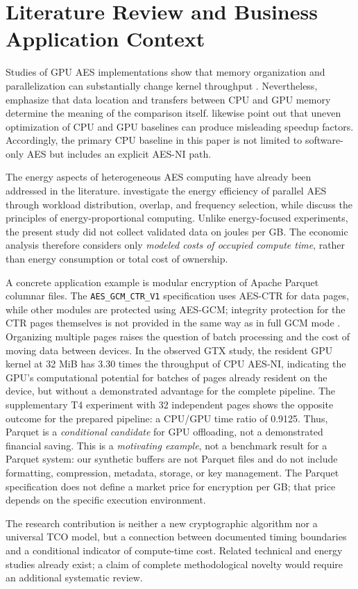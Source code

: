\documentclass[11pt,b5paper]{article}
\begin{document}
\section{Literature Review and Business Application Context}
Studies of GPU AES implementations show that memory organization and parallelization can substantially change kernel throughput \citep{iwai2012,tezcan2021}. Nevertheless, \citet{gregg2011} emphasize that data location and transfers between CPU and GPU memory determine the meaning of the comparison itself. \citet{lee2010} likewise point out that uneven optimization of CPU and GPU baselines can produce misleading speedup factors. Accordingly, the primary CPU baseline in this paper is not limited to software-only AES but includes an explicit AES-NI path.\par
The energy aspects of heterogeneous AES computing have already been addressed in the literature. \citet{fei2020} investigate the energy efficiency of parallel AES through workload distribution, overlap, and frequency selection, while \citet{barroso2007} discuss the principles of energy-proportional computing. Unlike energy-focused experiments, the present study did not collect validated data on joules per GB. The economic analysis therefore considers only \emph{modeled costs of occupied compute time}, rather than energy consumption or total cost of ownership.\par
A concrete application example is modular encryption of Apache Parquet columnar files. The \texttt{AES\_GCM\_CTR\_V1} specification uses AES-CTR for data pages, while other modules are protected using AES-GCM; integrity protection for the CTR pages themselves is not provided in the same way as in full GCM mode \citep{parquet_encrypt}. Organizing multiple pages raises the question of batch processing and the cost of moving data between devices. In the observed GTX study, the resident GPU kernel at 32 MiB has 3.30 times the throughput of CPU AES-NI, indicating the GPU's computational potential for batches of pages already resident on the device, but without a demonstrated advantage for the complete pipeline. The supplementary T4 experiment with 32 independent pages shows the opposite outcome for the prepared pipeline: a CPU/GPU time ratio of 0.9125. Thus, Parquet is a \emph{conditional candidate} for GPU offloading, not a demonstrated financial saving. This is a \emph{motivating example}, not a benchmark result for a Parquet system: our synthetic buffers are not Parquet files and do not include formatting, compression, metadata, storage, or key management. The Parquet specification does not define a market price for encryption per GB; that price depends on the specific execution environment.\par
The research contribution is neither a new cryptographic algorithm nor a universal TCO model, but a connection between documented timing boundaries and a conditional indicator of compute-time cost. Related technical and energy studies already exist; a claim of complete methodological novelty would require an additional systematic review.
\end{document}
